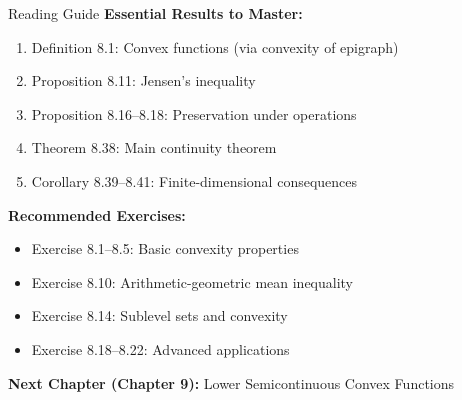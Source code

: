 \documentclass[aspectratio=169,10pt]{beamer}
\begin{document}
\begin{frame}{Reading Guide}
    \textbf{Essential Results to Master:}
    \begin{enumerate}
        \item Definition 8.1: Convex functions (via convexity of epigraph)
        \item Proposition 8.11: Jensen's inequality
        \item Proposition 8.16--8.18: Preservation under operations
        \item Theorem 8.38: Main continuity theorem
        \item Corollary 8.39--8.41: Finite-dimensional consequences
    \end{enumerate}

    \vspace{0.3cm}

    \textbf{Recommended Exercises:}
    \begin{itemize}
        \item Exercise 8.1--8.5: Basic convexity properties
        \item Exercise 8.10: Arithmetic-geometric mean inequality
        \item Exercise 8.14: Sublevel sets and convexity
        \item Exercise 8.18--8.22: Advanced applications
    \end{itemize}

    \vspace{0.3cm}

    \textbf{Next Chapter (Chapter 9):} Lower Semicontinuous Convex Functions
\end{frame}
\end{document}
